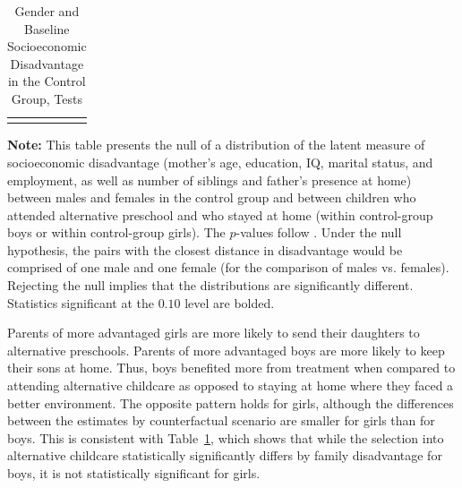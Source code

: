 \begin{table}[!htpb]
\begin{threeparttable}
\caption{Gender and Baseline Socioeconomic Disadvantage in the Control Group, Tests} \label{table:disadtests}
\centering
\begin{tabularx}{16.5cm}{XcX}
&  &
\end{tabularx}
\begin{tablenotes}
\footnotesize
\item \textbf{Note:} This table presents the null of a distribution of the latent measure of socioeconomic disadvantage (mother's age, education, IQ, marital status, and employment, as well as number of siblings and father's presence at home) between males and females in the control group and between children who attended  alternative preschool and who stayed at home (within control-group boys or within control-group girls). The $p$-values follow \citet{Rosenbaum_2005_Distribution_JRSS}. Under the null hypothesis, the pairs with the closest distance in disadvantage would be comprised of one male and one female (for the comparison of males vs. females). Rejecting the null implies that the distributions are significantly different. Statistics significant at the $0.10$ level are bolded.
\end{tablenotes}
\end{threeparttable}
\end{table}

Parents of more advantaged girls are more likely to send their daughters to alternative preschools. Parents of more advantaged boys are more likely to keep their sons at home. Thus, boys benefited more from treatment when compared to attending alternative childcare as opposed to staying at home where they faced a better environment. The opposite pattern holds for girls, although the differences between the estimates by counterfactual scenario are smaller for girls than for boys. This is consistent with Table~\ref{table:disadtests}, which shows that while the selection into alternative childcare statistically significantly differs by family disadvantage for boys, it is not statistically significant for girls. 
